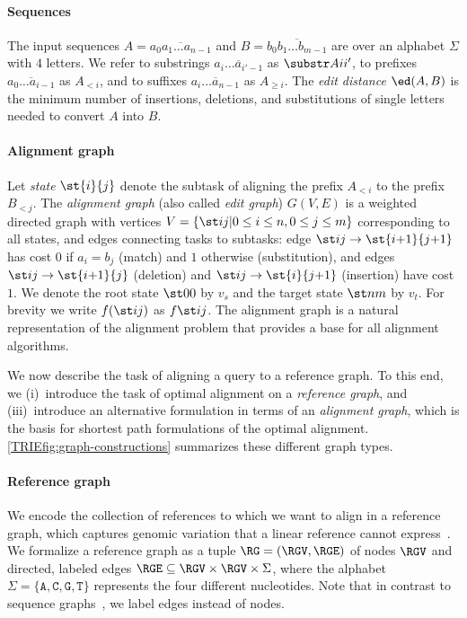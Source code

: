 \paragraph{Sequences}
The input sequences $A = \overline{a_0a_1\dots a_{n-1}}$ and $B =
\overline{b_0b_1 \dots b_{m-1}}$ are over an alphabet $\Sigma$ with $4$ letters.
We refer to substrings $\overline{a_i \dots a_{i'-1}}$ as $\substr Ai{i'}$, to
prefixes $\overline{a_0 \dots a_{i-1}}$ as $A_{<i}$, and to suffixes
$\overline{a_i \dots a_{n-1}}$ as $A_{\geq i}$. The \emph{edit distance}
$\ed(A,B)$ is the minimum number of insertions, deletions, and substitutions of
single letters needed to convert $A$ into $B$.

\paragraph{Alignment graph}
Let \emph{state} $\st{i}{j}$ denote the subtask of aligning the prefix $A_{<i}$
to the prefix $B_{<j}$. The \emph{alignment graph} (also called \emph{edit
graph}) $G(V,E)$ is a weighted directed graph with vertices $V = \{\st ij \vert
{0\leq i \leq n}, {0\leq j\leq m}\}$ corresponding to all states, and edges
connecting tasks to subtasks: edge ${\st ij \to \st{i{+}1}{j{+}1}}$ has cost $0$
if ${a_i = b_j}$ (match) and $1$ otherwise (substitution), and edges ${\st ij
\to \st{i{+}1}{j}}$ (deletion) and ${\st ij \to\st{i}{j{+}1}}$ (insertion) have
cost $1$. We denote the root state $\st 00$ by $v_s$ and the target state $\st
nm$ by $v_t$. For brevity we write $f(\st ij)$ as $f \st ij$. The alignment graph is
a natural representation of the alignment problem that provides a base for all
alignment algorithms.

We now describe the task of aligning a query to a reference graph. To this end,
we (i)~introduce the task of optimal alignment on a \emph{reference graph}, and
(iii)~introduce an alternative formulation in terms of an \emph{alignment
graph}, which is the basis for shortest path formulations of the optimal
alignment.
%
\cref{TRIEfig:graph-constructions} summarizes these different graph types.

\paragraph{Reference graph}
We encode the collection of references to which we want to align in a reference
graph, which captures genomic variation that a linear reference cannot
express~\cite{paten_genome_2017,garrison_variation_2018}.
%
We formalize a reference graph as a tuple $\RG=(\RGV,\RGE)$ of nodes $\RGV$ and
directed, labeled edges $\RGE \subseteq \RGV \times \RGV \times \Sigma$, where
the alphabet $\Sigma=\{\texttt{A},\texttt{C},\texttt{G},\texttt{T}\}$ represents
the four different nucleotides.
%
Note that in contrast to sequence graphs~\cite{rautiainen_aligning_2017}, we
label edges instead of nodes.

